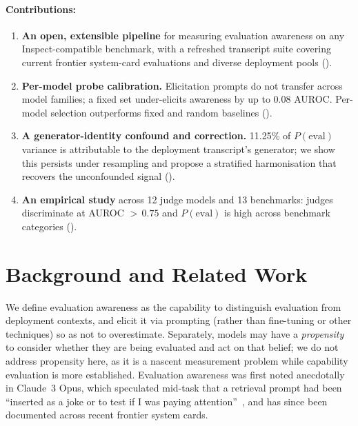 \documentclass{article}
\begin{document}
\paragraph{Contributions:}
\begin{enumerate}[nosep,leftmargin=*,label=(\arabic*)]
  \item \textbf{An open, extensible pipeline} for measuring evaluation
  awareness on any Inspect-compatible benchmark, with a refreshed
  transcript suite covering current frontier system-card evaluations
  and diverse deployment pools ().
  \item \textbf{Per-model probe calibration.} Elicitation prompts do
  not transfer across model families; a fixed set under-elicits
  awareness by up to 0.08 AUROC. Per-model selection outperforms fixed
  and random baselines ().
  \item \textbf{A generator-identity confound and correction.} 11.25\%
  of $P(\text{eval})$ variance is attributable to the deployment
  transcript's generator; we show this persists under resampling and
  propose a stratified harmonisation that recovers the unconfounded
  signal ().
  \item \textbf{An empirical study} across 12 judge models and 13
  benchmarks: judges discriminate at AUROC ${>}\,0.75$ and
  $P(\text{eval})$ is high across benchmark categories
  ().
\end{enumerate}

\section{Background and Related Work}
\label{sec:background}

We define evaluation awareness as the capability to distinguish
evaluation from deployment contexts, and elicit it via prompting (rather
than fine-tuning or other techniques) so as not to overestimate.
Separately, models may have a \emph{propensity} to consider whether
they are being evaluated and act on that belief; we do not address
propensity here, as it is a nascent measurement problem while
capability evaluation is more established. Evaluation awareness was
first noted anecdotally in Claude~3 Opus, which speculated mid-task
that a retrieval prompt had been ``inserted as a joke or to test if I
was paying attention''~\citep{anthropic2024claude3}, and has since
been documented across recent frontier system cards.
\end{document}
